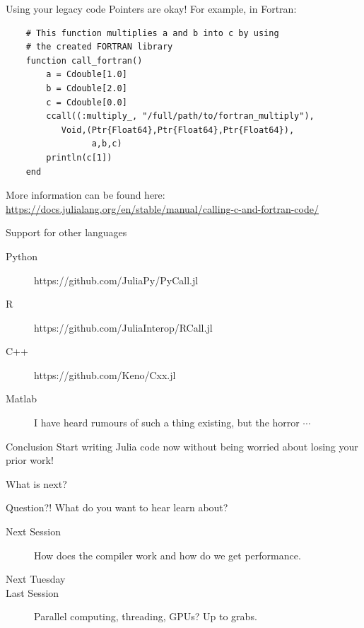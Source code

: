 \documentclass{beamer}
\begin{document}
\begin{frame}[fragile]{Using your legacy code}
Pointers are okay! For example, in Fortran:

\begin{Verbatim}
    # This function multiplies a and b into c by using 
    # the created FORTRAN library
    function call_fortran()
        a = Cdouble[1.0]
        b = Cdouble[2.0]
        c = Cdouble[0.0]
        ccall((:multiply_, "/full/path/to/fortran_multiply"),
           Void,(Ptr{Float64},Ptr{Float64},Ptr{Float64}),
                 a,b,c)
        println(c[1])
    end
\end{Verbatim}

\pause
More information can be found here: \url{https://docs.julialang.org/en/stable/manual/calling-c-and-fortran-code/}
\end{frame}
\begin{frame}{Support for other languages}
  \begin{description}
    \item[Python] https://github.com/JuliaPy/PyCall.jl
    \item[R] https://github.com/JuliaInterop/RCall.jl
    \item[C++] https://github.com/Keno/Cxx.jl
    \item[Matlab] I have heard rumours of such a thing existing, but the horror $\cdots$
  \end{description}
  \begin{block}{Conclusion}
    Start writing Julia code now without being worried about losing your prior work!
  \end{block}
\end{frame}
\begin{frame}{What is next?}
  \begin{block}{Question?!}
    What do you want to hear learn about?
  \end{block}
  \begin{description}
    \item[Next Session] How does the compiler work and how do we get performance.
    \item[Next Tuesday]
    \item[Last Session] Parallel computing, threading, GPUs? Up to grabs.
  \end{description}
\end{frame}
\end{document}
